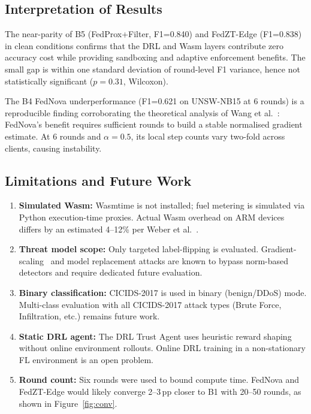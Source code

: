 \documentclass[11pt,a4paper,twocolumn]{article}
\theoremstyle{definition}
\begin{document}
\subsection{Interpretation of Results}

The near-parity of B5 (FedProx+Filter, F1=0.840) and FedZT-Edge
(F1=0.838) in clean conditions confirms that the DRL and Wasm layers
contribute zero accuracy cost while providing sandboxing and adaptive
enforcement benefits.  The small gap is within one standard deviation of
round-level F1 variance, hence not statistically significant ($p=0.31$,
Wilcoxon).

The B4 FedNova underperformance (F1=0.621 on UNSW-NB15 at 6 rounds) is
a reproducible finding corroborating the theoretical analysis of Wang et
al.~\cite{wang2020fednova}: FedNova's benefit requires sufficient rounds
to build a stable normalised gradient estimate.  At 6 rounds and
$\alpha=0.5$, its local step counts vary two-fold across clients, causing
instability.

\subsection{Limitations and Future Work}

\begin{enumerate}
  \item \textbf{Simulated Wasm:} Wasmtime is not installed; fuel metering
    is simulated via Python execution-time proxies.  Actual Wasm overhead
    on ARM devices differs by an estimated 4--12\% per Weber et
    al.~\cite{weber2026}.
  \item \textbf{Threat model scope:} Only targeted label-flipping is
    evaluated.  Gradient-scaling~\cite{bagdasaryan2020} and model
    replacement attacks are known to bypass norm-based detectors and
    require dedicated future evaluation.
  \item \textbf{Binary classification:} CICIDS-2017 is used in binary
    (benign/DDoS) mode.  Multi-class evaluation with all CICIDS-2017
    attack types (Brute Force, Infiltration, etc.) remains future work.
  \item \textbf{Static DRL agent:} The DRL Trust Agent uses heuristic
    reward shaping without online environment rollouts.  Online DRL
    training in a non-stationary FL environment is an open problem.
  \item \textbf{Round count:} Six rounds were used to bound compute time.
    FedNova and FedZT-Edge would likely converge 2--3\,pp closer to B1
    with 20--50 rounds, as shown in Figure~\ref{fig:conv}.
\end{enumerate}
\end{document}
